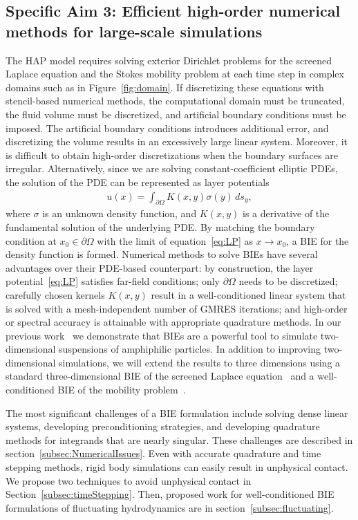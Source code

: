 \newpage

\subsection{Specific Aim 3: Efficient high-order numerical methods for
large-scale simulations}
\label{subsec:specific_aim_3}
The HAP model requires solving exterior Dirichlet problems for the
screened Laplace equation and the Stokes mobility problem at each time
step in complex domains such as in Figure~\ref{fig:domain}. If
discretizing these equations with stencil-based numerical methods, the
computational domain must be truncated, the fluid volume must be
discretized, and artificial boundary conditions must be imposed. The
artificial boundary conditions introduces additional error, and
discretizing the volume results in an excessively large linear system.
Moreover, it is difficult to obtain high-order discretizations when the
boundary surfaces are irregular. Alternatively, since we are solving
constant-coefficient elliptic PDEs, the solution of the PDE can be
represented as layer potentials
\begin{align}
  \label{eq:LP}
  u(x) = \int_{\partial\Omega} K(x,y) \sigma(y)\,ds_y,
\end{align}
where $\sigma$ is an unknown density function, and $K(x,y)$ is a
derivative of the fundamental solution of the underlying PDE. By
matching the boundary condition at $x_0 \in \partial\Omega$ with the
limit of equation~\eqref{eq:LP} as $x\rightarrow x_0$, a BIE for the
density function is formed. Numerical methods to solve BIEs have several
advantages over their PDE-based counterpart: by construction, the layer
potential~\eqref{eq:LP} satisfies far-field conditions; only
$\partial\Omega$ needs to be discretized; carefully chosen kernels
$K(x,y)$ result in a well-conditioned linear system that is solved with
a mesh-independent number of GMRES iterations; and high-order or
spectral accuracy is attainable with appropriate quadrature methods. In
our previous work~\cite{Fu2018_SIAM} we demonstrate that BIEs are a
powerful tool to simulate two-dimensional suspensions of amphiphilic
particles. In addition to improving two-dimensional simulations, we will
extend the results to three dimensions using a standard
three-dimensional BIE of the screened Laplace equation~\cite{ying_2006}
and a well-conditioned BIE of the mobility problem~\cite{manasthesis,
rac-gre2016}.

The most significant challenges of a BIE formulation include solving
dense linear systems, developing preconditioning strategies, and
developing quadrature methods for integrands that are nearly singular.
These challenges are described in section~\ref{subsec:NumericalIssues}.
Even with accurate quadrature and time stepping methods, rigid body
simulations can easily result in unphysical contact. We propose two
techniques to avoid unphysical contact in
Section~\ref{subsec:timeStepping}. Then, proposed work for well-conditioned BIE
formulations of fluctuating hydrodynamics are in
section~\ref{subsec:fluctuating}.


